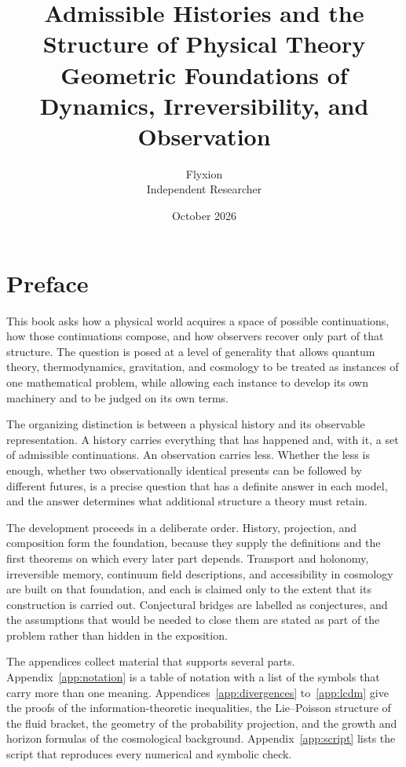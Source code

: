 \documentclass[11pt,oneside]{book}
\title{\textbf{Admissible Histories and the Structure of Physical Theory}\\[0.6em]
\large Geometric Foundations of Dynamics, Irreversibility, and Observation}
\author{Flyxion\\Independent Researcher}
\date{October 2026}
\theoremstyle{definition}
\theoremstyle{remark}
\begin{document}
\frontmatter
\maketitle
\tableofcontents

\chapter*{Preface}

This book asks how a physical world acquires a space of possible continuations, how those continuations compose, and how observers recover only part of that structure. The question is posed at a level of generality that allows quantum theory, thermodynamics, gravitation, and cosmology to be treated as instances of one mathematical problem, while allowing each instance to develop its own machinery and to be judged on its own terms.

The organizing distinction is between a physical history and its observable representation. A history carries everything that has happened and, with it, a set of admissible continuations. An observation carries less. Whether the less is enough, whether two observationally identical presents can be followed by different futures, is a precise question that has a definite answer in each model, and the answer determines what additional structure a theory must retain.

The development proceeds in a deliberate order. History, projection, and composition form the foundation, because they supply the definitions and the first theorems on which every later part depends. Transport and holonomy, irreversible memory, continuum field descriptions, and accessibility in cosmology are built on that foundation, and each is claimed only to the extent that its construction is carried out. Conjectural bridges are labelled as conjectures, and the assumptions that would be needed to close them are stated as part of the problem rather than hidden in the exposition.

The appendices collect material that supports several parts. Appendix~\ref{app:notation} is a table of notation with a list of the symbols that carry more than one meaning. Appendices~\ref{app:divergences} to~\ref{app:lcdm} give the proofs of the information-theoretic inequalities, the Lie--Poisson structure of the fluid bracket, the geometry of the probability projection, and the growth and horizon formulas of the cosmological background. Appendix~\ref{app:script} lists the script that reproduces every numerical and symbolic check.
\end{document}
